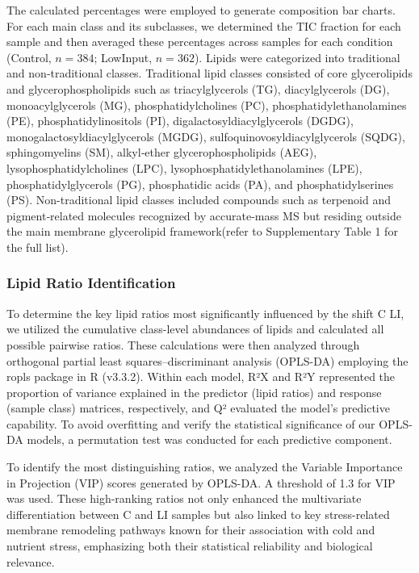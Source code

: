 \documentclass[10pt,letterpaper]{article}
\begin{document}
The calculated percentages were employed to generate composition bar charts. For each main class and its subclasses, we determined the TIC fraction for each sample and then averaged these percentages across samples for each condition (Control, $n=384$; LowInput, $n=362$). Lipids were categorized into traditional and non‐traditional classes. Traditional lipid classes consisted of core glycerolipids and glycerophospholipids such as triacylglycerols (TG), diacylglycerols (DG), monoacylglycerols (MG), phosphatidylcholines (PC), phosphatidylethanolamines (PE), phosphatidylinositols (PI), digalactosyldiacylglycerols (DGDG), monogalactosyldiacylglycerols (MGDG), sulfoquinovosyldiacylglycerols (SQDG), sphingomyelins (SM), alkyl‐ether glycerophospholipids (AEG), lysophosphatidylcholines (LPC), lysophosphatidylethanolamines (LPE), phosphatidylglycerols (PG), phosphatidic acids (PA), and phosphatidylserines (PS). Non-traditional lipid classes included compounds such as terpenoid and pigment‐related molecules recognized by accurate‐mass MS but residing outside the main membrane glycerolipid framework(refer to Supplementary Table 1 for the full list). 

\subsubsection*{Lipid Ratio Identification}
To determine the key lipid ratios most significantly influenced by the shift C LI, we utilized the cumulative class-level abundances of lipids and calculated all possible pairwise ratios. These calculations were then analyzed through orthogonal partial least squares–discriminant analysis (OPLS-DA) employing the ropls package in R (v3.3.2). Within each model, R²X and R²Y represented the proportion of variance explained in the predictor (lipid ratios) and response (sample class) matrices, respectively, and Q² evaluated the model's predictive capability. To avoid overfitting and verify the statistical significance of our OPLS-DA models, a permutation test was conducted for each predictive component.

To identify the most distinguishing ratios, we analyzed the Variable Importance in Projection (VIP) scores generated by OPLS-DA. A threshold of 1.3 for VIP was used. These high-ranking ratios not only enhanced the multivariate differentiation between C and LI samples but also linked to key stress-related membrane remodeling pathways known for their association with cold and nutrient stress, emphasizing both their statistical reliability and biological relevance.
\end{document}
